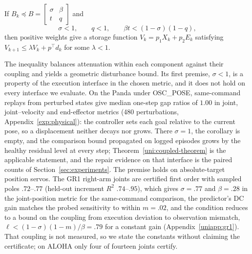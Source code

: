 
\begin{corollary}
\label{uni:smallgain}
If $B_k\preceq B=\left[\begin{smallmatrix}\sigma&\beta\\t&q\end{smallmatrix}\right]$
and
\begin{equation}
 \sigma<1,\qquad q<1,\qquad \beta t<(1-\sigma)(1-q),
 \label{uni:smallgain-condition}
\end{equation}
then positive weights give a storage function $V_k=p_1X_k+p_2E_k$ satisfying
$V_{k+1}\le\lambda V_k+p^\top d_k$ for some $\lambda<1$.
\end{corollary}
The inequality balances attenuation within each component against their
coupling and yields a geometric disturbance bound. Its first premise,
$\sigma<1$, is a property of the execution interface in the chosen metric,
and it does not hold on every interface we evaluate. On the Panda under
OSC\_POSE, same-command replays from perturbed states give median one-step
gap ratios of $1.00$ in joint, joint--velocity and end-effector metrics
(480 perturbations, Appendix~\ref{exp:physical}): the controller sets each
goal relative to the current pose, so a displacement neither decays nor
grows. There $\sigma=1$, the corollary is empty, and the comparison bound
propagated on logged episodes grows by the healthy residual level at every
step; Theorem~\ref{uni:coupled-theorem} is the applicable statement, and the
repair evidence on that interface is the paired counts of
Section~\ref{sec:experiments}. The premise holds on absolute-target position
servos. The GR1 right-arm joints are certified first order with sampled poles
$.72$--$.77$ (held-out increment $R^2$ $.74$--$.95$), which gives
$\sigma=.77$ and $\beta=.28$ in the joint-position metric for the same-command
comparison, the predictor's DC gain matches the probed sensitivity to within
$m=.02$, and the condition reduces to a bound on the coupling from execution
deviation to observation mismatch, $\ell<(1-\sigma)(1-m)/\beta=.79$ for a
constant gain (Appendix~\ref{uniapp:gr1}). That coupling is not measured, so
we state the constants without claiming the certificate; on ALOHA only four of
fourteen joints certify.
